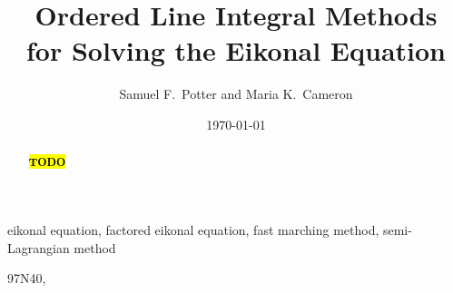 \documentclass{siamart171218}
\begin{document}
\title{Ordered Line Integral Methods \\ for Solving the Eikonal Equation}
\author{Samuel F.\ Potter and Maria K.\ Cameron}
\date{\today}

\maketitle

\begin{abstract}
  \hl{\textbf{TODO}}
\end{abstract}

\begin{keywords}
  eikonal equation, factored eikonal equation, fast marching method,
  semi-Lagrangian method
\end{keywords}

\begin{AMS}
  97N40, %
\end{AMS}









{}

\appendix

\newpage


\newpage


\newpage






\end{document}

